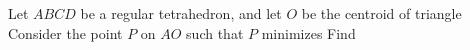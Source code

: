 Let $ ABCD$ be a regular tetrahedron, and let $ O$ be the centroid of triangle  Consider the point $ P$ on $ AO$ such that $ P$ minimizes  Find 